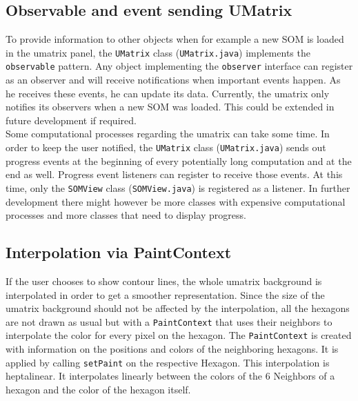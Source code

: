 \documentclass[a4paper]{scrartcl}
\begin{document}
\subsection{Observable and event sending UMatrix}
To provide information to other objects when for example a new SOM is loaded in the umatrix panel, the \verb|UMatrix| class (\verb|UMatrix.java|) implements the \verb|observable| pattern. Any object implementing the \verb|observer| interface can register as an observer and will receive notifications when important events happen. As he receives these events, he can update its data. Currently, the umatrix only notifies its observers when a new SOM was loaded. This could be extended in future development if required. \\
Some computational processes regarding the umatrix can take some time. In order to keep the user notified, the \verb|UMatrix| class (\verb|UMatrix.java|) sends out progress events at the beginning of every potentially long computation and at the end as well. Progress event listeners can register to receive those events. At this time, only the \verb|SOMView| class (\verb|SOMView.java|) is registered as a listener. In further development there might however be more classes with expensive computational processes and more classes that need to display progress.
\subsection{Interpolation via PaintContext}
If the user chooses to show contour lines, the whole umatrix background is interpolated in order to get a smoother representation.
Since the size of the umatrix background should not be affected by the interpolation, all the hexagons are not drawn as usual but with a \verb|PaintContext| that uses their neighbors to interpolate the color for every pixel on the hexagon. The \verb|PaintContext| is created with information on the positions and colors of the neighboring hexagons. It is applied by calling \verb|setPaint| on the respective Hexagon.
This interpolation is heptalinear. It interpolates linearly between the colors of the 6 Neighbors of a hexagon and the color of the hexagon itself.
\end{document}

